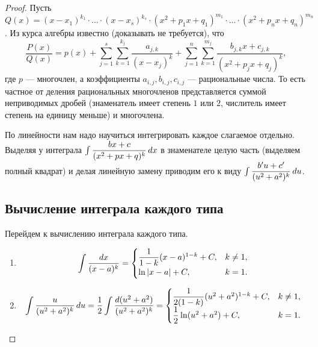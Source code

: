 \documentclass[a4paper]{article}
\theoremstyle{named}
\renewcommand{\int}{\intop}
\begin{document}
        \begin{proof}
            Пусть $Q(x) = (x - x_1)^{k_1} \cdot \dots \cdot (x - x_s)^{k_s} \cdot (x^2 + p_1x + q_1)^{m_1} \cdot \dots \cdot (x^2 + p_nx + q_n)^{m_n}$. Из курса алгебры известно (доказывать не требуется), что
            \begin{equation*}
                \dfrac{P(x)}{Q(x)} = p(x) + \sum_{j = 1}^s \sum_{k = 1}^{k_j} \dfrac{a_{j, k}}{(x - x_j)^k} + \sum_{j = 1}^n \sum_{k = 1}^{m_j} \dfrac{b_{j, k}x + c_{j, k}}{(x^2 + p_jx + q_j)^k},
            \end{equation*}
            где $p$ --- многочлен, а коэффициенты $a_{i, j}, b_{i, j}, c_{i, j}$ --- рациональные числа. То есть частное от деления рациональных многочленов представляется суммой неприводимых дробей (знаменатель имеет степень $1$ или $2$, числитель имеет степень на единицу меньше) и многочлена.

            По линейности нам надо научиться интегрировать каждое слагаемое отдельно. Выделяя у интеграла $\int \dfrac{bx + c}{(x^2 + px + q)^k} \dd x$ в знаменателе целую часть (выделяем полный квадрат) и делая линейную замену приводим его к виду $\int \dfrac{b'u + c'}{(u^2 + a^2)^k} \dd u$.

            \subsection{Вычисление интеграла каждого типа}

            Перейдем к вычислению интеграла каждого типа.

            \begin{enumerate}
            \item
                \begin{equation*}
                    \int \dfrac{\dd x}{(x - a)^k} = \begin{cases}
                        \dfrac{1}{1 - k}(x - a)^{1 - k} + C, &k \neq 1, \\
                        \ln |x - a| + C, &k = 1.
                    \end{cases}
                \end{equation*}

            \item
                \begin{equation*}
                    \int \dfrac{u}{(u^2 + a^2)^k} \dd u
                    = \dfrac{1}{2} \int \dfrac{\dd (u^2 + a^2)}{(u^2 + a^2)^k}
                    = \begin{cases}
                        \dfrac{1}{2(1 - k)}(u^2 + a^2)^{1 - k} + C, &k \neq 1, \\
                        \dfrac{1}{2} \ln(u^2 + a^2) + C, &k = 1.
                    \end{cases}
                \end{equation*}


\end{enumerate}
\end{proof}
\end{document}
